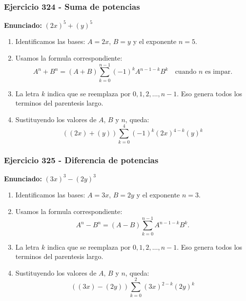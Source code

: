 \documentclass[11pt,a4paper]{article}
\begin{document}
\subsubsection*{Ejercicio 324 - Suma de potencias}
\textbf{Enunciado:} $ \left(2 x\right)^{5}+\left(y\right)^{5} $\par
\begin{enumerate}[leftmargin=2em]
\item Identificamos las bases: \(A=2 x\), \(B=y\) y el exponente \(n=5\).
\item Usamos la formula correspondiente: \[A^n+B^n=(A+B)\sum_{k=0}^{n-1}(-1)^kA^{n-1-k}B^k\quad\text{cuando }n\text{ es impar}.\]
\item La letra \(k\) indica que se reemplaza por \(0,1,2,\ldots,n-1\). Eso genera todos los terminos del parentesis largo.
\item Sustituyendo los valores de \(A\), \(B\) y \(n\), queda: \[\boxed{\left(\left(2 x\right)+\left(y\right)\right)\sum_{k=0}^{4}(-1)^k\left(2 x\right)^{4-k}\left(y\right)^k}\]
\end{enumerate}

\vspace{0.2cm}
\subsubsection*{Ejercicio 325 - Diferencia de potencias}
\textbf{Enunciado:} $ \left(3 x\right)^{3}-\left(2 y\right)^{3} $\par
\begin{enumerate}[leftmargin=2em]
\item Identificamos las bases: \(A=3 x\), \(B=2 y\) y el exponente \(n=3\).
\item Usamos la formula correspondiente: \[A^n-B^n=(A-B)\sum_{k=0}^{n-1}A^{n-1-k}B^k.\]
\item La letra \(k\) indica que se reemplaza por \(0,1,2,\ldots,n-1\). Eso genera todos los terminos del parentesis largo.
\item Sustituyendo los valores de \(A\), \(B\) y \(n\), queda: \[\boxed{\left(\left(3 x\right)-\left(2 y\right)\right)\sum_{k=0}^{2}\left(3 x\right)^{2-k}\left(2 y\right)^k}\]
\end{enumerate}

\vspace{0.2cm}
\end{document}
